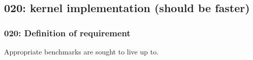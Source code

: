 \subsection{020: kernel implementation (should be faster)}

\subsubsection{020: Definition of requirement }

Appropriate benchmarks are sought to live up to.

